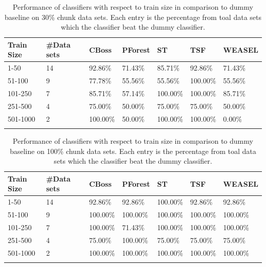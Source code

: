 \begin{table}[hp!]
	\setlength\extrarowheight{2pt} %
	\begin{tabularx}{\textwidth}{|X|X|X|X|X|X|X|}
	\hline
	\textbf{Train Size} & \textbf{\#Data sets} & \textbf{CBoss} & \textbf{PForest} & \textbf{ST} & \textbf{TSF} & \textbf{WEASEL} \\ \hline
		1-50 & 14 & 92.86\% & 71.43\% & 85.71\% & 92.86\% & 71.43\% \\ \hline
		51-100 & 9 & 77.78\% & 55.56\% & 55.56\% & 100.00\% & 55.56\% \\ \hline
		101-250 & 7 & 85.71\% & 57.14\% & 100.00\% & 100.00\% & 85.71\% \\ \hline
		251-500 & 4 & 75.00\% & 50.00\% & 75.00\% & 75.00\% & 50.00\% \\ \hline
		501-1000 & 2 &100.00\% & 50.00\% & 100.00\% & 100.00\% & 0.00\% \\ \hline
	\caption{Performance of classifiers with respect to train size in comparison to dummy baseline on 30\% chunk data sets. Each entry is the percentage from toal data sets which the classifier beat the dummy classifier.}
	\label{TableSize30}
  \end{tabularx}
\end{table}

\begin{table}[hp!]
	\setlength\extrarowheight{2pt} %
	\begin{tabularx}{\textwidth}{|X|X|X|X|X|X|X|}
	\hline
	\textbf{Train Size} & \textbf{\#Data sets} & \textbf{CBoss} & \textbf{PForest} & \textbf{ST} & \textbf{TSF} & \textbf{WEASEL} \\ \hline
		1-50 & 14 & 92.86\% & 92.86\% & 100.00\% & 92.86\% & 92.86\% \\ \hline
		51-100 & 9 & 100.00\% & 100.00\% & 100.00\% & 100.00\% & 100.00\% \\ \hline
		101-250 & 7 & 100.00\% & 71.43\% & 100.00\% & 100.00\% & 100.00\% \\ \hline
		251-500 & 4 & 75.00\% & 100.00\% & 75.00\% & 75.00\% & 75.00\% \\ \hline
		501-1000 & 2 &100.00\% & 100.00\% & 100.00\% & 100.00\% & 100.00\% \\ \hline
  \caption{Performance of classifiers with respect to train size in comparison to dummy baseline on 100\% chunk data sets. Each entry is the percentage from toal data sets which the classifier beat the dummy classifier.}
  \label{TableSize100}
  \end{tabularx}
\end{table}


